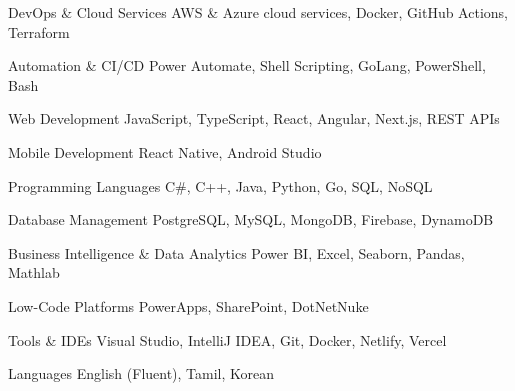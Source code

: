 
\begin{cvskills}

  \cvskill
    {DevOps \& Cloud Services} %
    {AWS \& Azure cloud services, Docker, GitHub Actions, Terraform} %

  \cvskill
    {Automation \& CI/CD} %
    {Power Automate, Shell Scripting, GoLang, PowerShell, Bash} %

  \cvskill
    {Web Development} %
    {JavaScript, TypeScript, React, Angular, Next.js, REST APIs} %

  \cvskill
    {Mobile Development} %
    {React Native, Android Studio} %

  \cvskill
    {Programming Languages} %
    {C\#, C++, Java, Python, Go, SQL, NoSQL} %

  \cvskill
    {Database Management} %
    {PostgreSQL, MySQL, MongoDB, Firebase, DynamoDB} %

  \cvskill
    {Business Intelligence \& Data Analytics} %
    {Power BI, Excel, Seaborn, Pandas, Mathlab} %

  \cvskill
    {Low-Code Platforms} %
    {PowerApps, SharePoint, DotNetNuke} %

  \cvskill
    {Tools \& IDEs} %
    {Visual Studio, IntelliJ IDEA, Git, Docker, Netlify, Vercel} %

  \cvskill
    {Languages} %
    {English (Fluent), Tamil, Korean} %

\end{cvskills}
